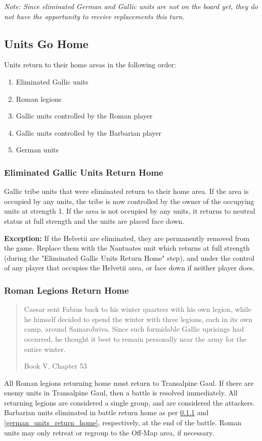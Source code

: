 \textit{Note: Since eliminated German and Gallic units are not on the board yet, they do not have the opportunity to receive replacements this turn.}

\begin{samepage}
\subsection{Units Go Home}
\par
Units return to their home areas in the following order:
\begin{enumerate}
  \setlength\itemsep{0em}
  \item {\small Eliminated Gallic units}
  \item {\small Roman legions}
  \item {\small Gallic units controlled by the Roman player}
  \item {\small Gallic units controlled by the Barbarian player}
  \item {\small German units}
\end{enumerate}
\end{samepage}

\subsubsection{Eliminated Gallic Units Return Home}
\label{eliminated_gallic_units_return_home}
\par
Gallic tribe units that were eliminated return to their home area. If the area is occupied by any units, the tribe is now controlled by the owner of the occupying units at strength 1. If the area is not occupied by any units, it returns to neutral status at full strength and the units are placed face down.

\textbf{Exception:} If the Helvetii are eliminated, they are permanently removed from the game. Replace them with the Nantuates unit which returns at full strength (during the "Eliminated Gallic Units Return Home" step), and under the control of any player that occupies the Helvetii area, or face down if neither player does.

\subsubsection{Roman Legions Return Home}
\blockquote[Book V, Chapter 53]{Caesar sent Fabius back to his winter quarters with his own legion, while he himself decided to spend the winter with three legions, each in its own camp, around Samarobriva. Since such formidable Gallic uprisings had occurred, he thought it best to remain personally near the army for the entire winter.}
\par
All Roman legions returning home must return to Transalpine Gaul. If there are enemy units in Transalpine Gaul, then a battle is resolved immediately. All returning legions are considered a single group, and are considered the attackers. Barbarian units eliminated in battle return home as per \ref{eliminated_gallic_units_return_home} and \ref{german_units_return_home}, respectively, at the end of the battle. Roman units may only retreat or regroup to the Off-Map area, if necessary.

